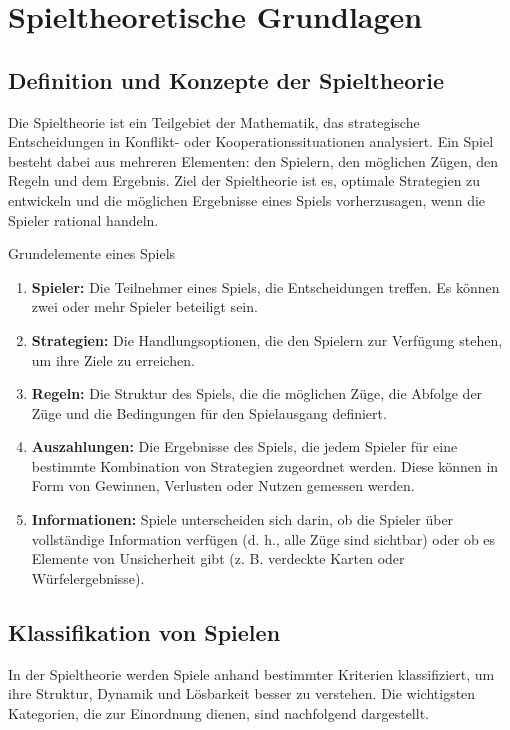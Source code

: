 \chapter{Spieltheoretische Grundlagen}

\section{Definition und Konzepte der Spieltheorie}
Die Spieltheorie ist ein Teilgebiet der Mathematik, das strategische Entscheidungen in Konflikt- oder Kooperationssituationen analysiert. Ein Spiel besteht dabei aus mehreren Elementen: den Spielern, den möglichen Zügen, den Regeln und dem Ergebnis. Ziel der Spieltheorie ist es, optimale Strategien zu entwickeln und die möglichen Ergebnisse eines Spiels vorherzusagen, wenn die Spieler rational handeln.

Grundelemente eines Spiels

\begin{enumerate}
	\item \textbf{Spieler:} Die Teilnehmer eines Spiels, die Entscheidungen treffen. Es können zwei oder mehr Spieler beteiligt sein.
	\item \textbf{Strategien:} Die Handlungsoptionen, die den Spielern zur Verfügung stehen, um ihre Ziele zu erreichen.
	\item \textbf{Regeln:} Die Struktur des Spiels, die die möglichen Züge, die Abfolge der Züge und die Bedingungen für den Spielausgang definiert.
	\item \textbf{Auszahlungen:} Die Ergebnisse des Spiels, die jedem Spieler für eine bestimmte Kombination von Strategien zugeordnet werden. Diese können in Form von Gewinnen, Verlusten oder Nutzen gemessen werden.
	\item \textbf{Informationen:} Spiele unterscheiden sich darin, ob die Spieler über vollständige Information verfügen (d. h., alle Züge sind sichtbar) oder ob es Elemente von Unsicherheit gibt (z. B. verdeckte Karten oder Würfelergebnisse).
\end{enumerate}
\section{Klassifikation von Spielen}
In der Spieltheorie werden Spiele anhand bestimmter Kriterien klassifiziert, um ihre Struktur, Dynamik und Lösbarkeit besser zu verstehen. Die wichtigsten Kategorien, die zur Einordnung dienen, sind nachfolgend dargestellt.

